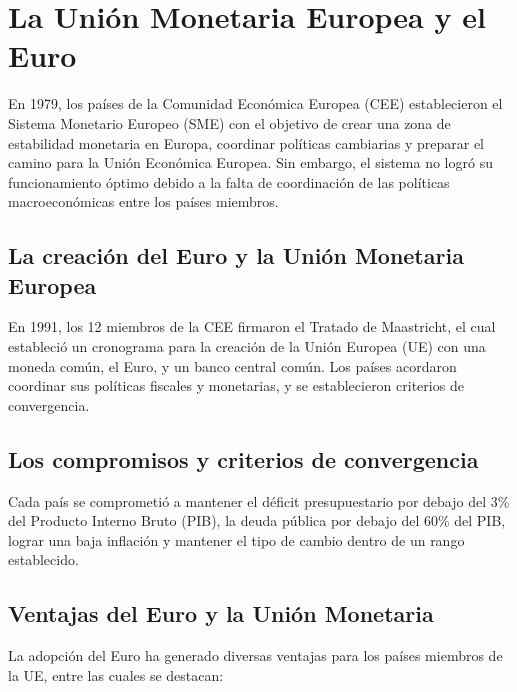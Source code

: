 \documentclass[
  letterpaper,
  DIV=11,
  numbers=noendperiod]{scrartcl}
\begin{document}
\hypertarget{la-uniuxf3n-monetaria-europea-y-el-euro}{%
\section{La Unión Monetaria Europea y el
Euro}\label{la-uniuxf3n-monetaria-europea-y-el-euro}}

En 1979, los países de la Comunidad Económica Europea (CEE)
establecieron el Sistema Monetario Europeo (SME) con el objetivo de
crear una zona de estabilidad monetaria en Europa, coordinar políticas
cambiarias y preparar el camino para la Unión Económica Europea. Sin
embargo, el sistema no logró su funcionamiento óptimo debido a la falta
de coordinación de las políticas macroeconómicas entre los países
miembros.

\hypertarget{la-creaciuxf3n-del-euro-y-la-uniuxf3n-monetaria-europea}{%
\subsection{La creación del Euro y la Unión Monetaria
Europea}\label{la-creaciuxf3n-del-euro-y-la-uniuxf3n-monetaria-europea}}

En 1991, los 12 miembros de la CEE firmaron el Tratado de Maastricht, el
cual estableció un cronograma para la creación de la Unión Europea (UE)
con una moneda común, el Euro, y un banco central común. Los países
acordaron coordinar sus políticas fiscales y monetarias, y se
establecieron criterios de convergencia.

\hypertarget{los-compromisos-y-criterios-de-convergencia}{%
\subsection{Los compromisos y criterios de
convergencia}\label{los-compromisos-y-criterios-de-convergencia}}

Cada país se comprometió a mantener el déficit presupuestario por debajo
del 3\% del Producto Interno Bruto (PIB), la deuda pública por debajo
del 60\% del PIB, lograr una baja inflación y mantener el tipo de cambio
dentro de un rango establecido.

\hypertarget{ventajas-del-euro-y-la-uniuxf3n-monetaria}{%
\subsection{Ventajas del Euro y la Unión
Monetaria}\label{ventajas-del-euro-y-la-uniuxf3n-monetaria}}

La adopción del Euro ha generado diversas ventajas para los países
miembros de la UE, entre las cuales se destacan:
\end{document}
